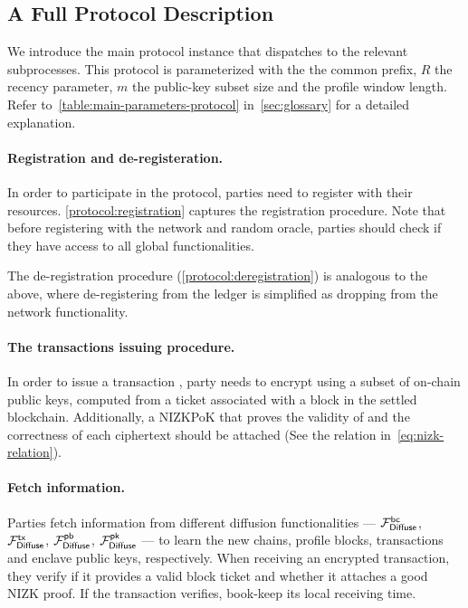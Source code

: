 \subsection{A Full Protocol Description}
\label{subsec:protocol-desc}

We introduce the main \protocFairLedger protocol instance that dispatches to the relevant subprocesses.
%
This protocol is parameterized with the \CPLen the common prefix, $R$ the recency parameter, $m$ the public-key subset size and \PBWindowLen the profile window length.
%
Refer to~\cref{table:main-parameters-protocol} in~\cref{sec:glossary} for a detailed explanation.



\paragraph{Registration and de-registeration.}
%
In order to participate in the protocol, parties need to register with their resources.
%
\cref{protocol:registration} captures the registration procedure.
%
Note that before registering with the network and random oracle, parties should check if they have access to all global functionalities.



The de-registration procedure (\cref{protocol:deregistration}) is analogous to the above, where de-registering from the ledger is simplified as dropping from the network functionality.



\paragraph{The transactions issuing procedure.}
%
In order to issue a transaction \tx, party \party needs to encrypt \tx using a subset of on-chain public keys, computed from a ticket associated with a block in the settled blockchain.
%
Additionally, a NIZKPoK that proves the validity of \tx and the correctness of each ciphertext should be attached (See the relation in~\cref{eq:nizk-relation}).



\paragraph{Fetch information.}
%
Parties fetch information from different diffusion functionalities --- $\mathcal{F}_{\mathsf{Diffuse}}^{\mathsf{bc}}$, $\mathcal{F}_{\mathsf{Diffuse}}^{\mathsf{tx}}$, $\mathcal{F}_{\mathsf{Diffuse}}^{\mathsf{pb}}$, $\mathcal{F}_{\mathsf{Diffuse}}^\mathsf{pk}$ --- to learn the new chains, profile blocks, transactions and enclave public keys, respectively.
%
When receiving an encrypted transaction, they verify if it provides a valid block ticket and whether it attaches a good NIZK proof.
%
If the transaction verifies, book-keep its local receiving time.

